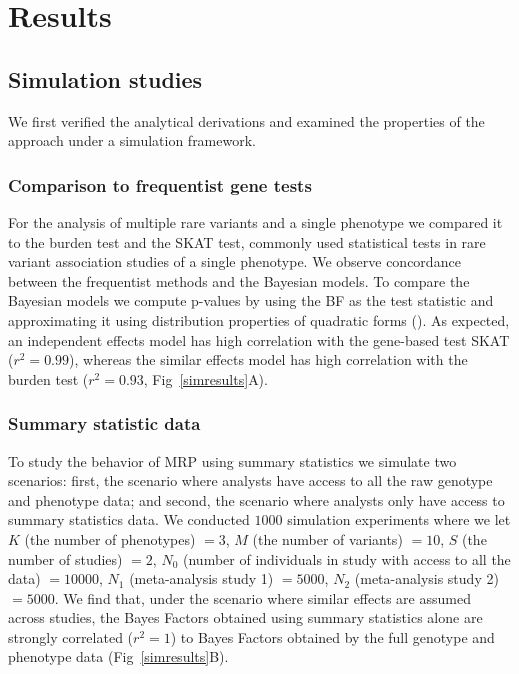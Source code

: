 \section*{Results}

\subsection*{Simulation studies}
We first verified the analytical derivations and examined the properties of the approach under a simulation framework. 

\subsubsection*{Comparison to frequentist gene tests}
For the analysis of multiple rare variants and a single phenotype we compared it to the burden test and the SKAT test, commonly used statistical tests in rare variant association studies of a single phenotype. We observe concordance between the frequentist methods and the Bayesian models. To compare the Bayesian models we compute p-values by using the BF as the test statistic and approximating it using distribution properties of quadratic forms (). As expected, an independent effects model has high correlation with the gene-based test SKAT ($r^2 = 0.99$), whereas the similar effects model has high correlation with the burden test ($r^2 = 0.93$, Fig~\ref{simresults}A). 

\subsubsection*{Summary statistic data}
To study the behavior of MRP using summary statistics we simulate two scenarios: first, the scenario where analysts have access to all the raw genotype and phenotype data; and second, the scenario where analysts only have access to summary statistics data\cite{liu2014meta}. We conducted $1000$ simulation experiments where we let $K$ (the number of phenotypes) $=3$, $M$ (the number of variants) $=10$, $S$ (the number of studies) $=2$, $N_0$ (number of individuals in study with access to all the data) $= 10000$, $N_1$ (meta-analysis study 1) $= 5000$, $N_2$ (meta-analysis study 2) $= 5000$. We find that, under the scenario where similar effects are assumed across studies, the Bayes Factors obtained using summary statistics alone are strongly correlated ($r^2 = 1$) to Bayes Factors obtained by the full genotype and phenotype data (Fig~\ref{simresults}B).

